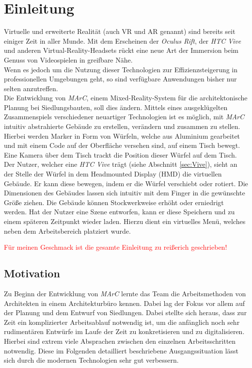 \section{Einleitung}\label{sec:Einleitung}
Virtuelle und erweiterte Realität (auch \glqq VR\grqq{} und \glqq AR\grqq{} genannt) sind bereits seit einiger Zeit in aller Munde. Mit dem Erscheinen der \textit{Oculus Rift}, der \textit{HTC Vive} und anderen Virtual-Reality-Headsets rückt eine neue Art der Immersion beim Genuss von Videospielen in greifbare Nähe.\\ 
Wenn es jedoch um die Nutzung dieser Technologien zur Effizienzsteigerung in professionellen Umgebungen geht, so sind verfügbare Anwendungen bisher nur selten anzutreffen.\\
Die Entwicklung von \textit{MArC}, einem Mixed-Reality-System für die architektonische Planung bei Siedlungsbauten, soll dies ändern. Mittels eines ausgeklügelten Zusammenspiels verschiedener neuartiger Technologien ist es möglich, mit \textit{MArC} intuitiv abstrahierte Gebäude zu erstellen, verändern und zusammen zu stellen. \\
Hierbei werden Marker in Form von Würfeln, welche aus Aluminium gearbeitet und mit einem Code auf der Oberfläche versehen sind, auf einem Tisch bewegt. Eine Kamera über dem Tisch trackt die Position dieser Würfel auf dem Tisch. Der Nutzer, welcher eine \textit{HTC Vive} trägt (siehe Abschnitt \ref{sec:Vive}), sieht an der Stelle der Würfel in dem Headmounted Display (HMD) die virtuellen Gebäude. Er kann diese bewegen, indem er die Würfel verschiebt oder rotiert. Die Dimensionen des Gebäudes lassen sich intuitiv mit dem Finger in die gewünschte Größe ziehen. Die Gebäude können Stockwerkweise erhöht oder erniedrigt werden. Hat der Nutzer eine Szene entworfen, kann er diese Speichern und zu einem späteren Zeitpunkt wieder laden. Hierzu dient ein virtuelles Menü, welches neben dem Arbeitsbereich platziert wurde.

\textcolor{red}{Für meinen Geschmack ist die gesamte Einleitung zu reißerich geschrieben!}

\subsection{Motivation}\label{sec:Motivation}
Zu Beginn der Entwicklung von \textit{MArC} lernte das Team die Arbeitsmethoden von Architekten in einem Architekturbüro kennen. Dabei lag der Fokus vor allem auf der Planung und dem Entwurf von Siedlungen. Dabei stellte sich heraus, dass zur Zeit ein komplizierter Arbeitsablauf notwendig ist, um die anfänglich noch sehr rudimentären Entwürfe im Laufe der Zeit zu konkretisieren und zu digitalisieren. Hierbei sind extrem viele Absprachen zwischen den einzelnen Arbeitsschritten notwendig. Diese im Folgenden detailliert beschriebene Ausgangssituation lässt sich durch die modernen Technologien sehr gut verbessern.




